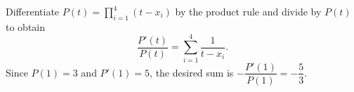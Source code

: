 Differentiate $P(t)=\prod_{i=1}^4(t-x_i)$ by the product rule and divide by $P(t)$ to obtain
\[\dfrac{P'(t)}{P(t)}=\sum_{i=1}^4\dfrac{1}{t-x_i}.\]
Since $P(1)=3$ and $P'(1)=5$, the desired sum is $-\dfrac{P'(1)}{P(1)}=\boxed{-\dfrac{5}{3}}$.
